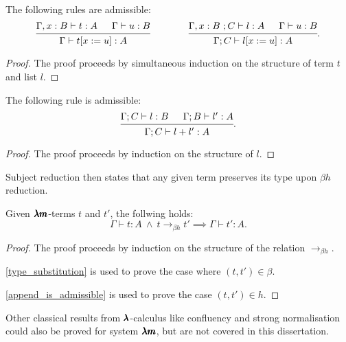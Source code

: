 \begin{lemma}
  \label{type_substitution}
  The following rules are admissible:
  \[
    \begin{prooftree}
      \hypo{ \Gamma , x:B \vdash t:A }
      \hypo{ \Gamma \vdash u:B }
      \infer2{ \Gamma \vdash  t[x := u] : A }      
    \end{prooftree}
    \qquad \qquad
    \begin{prooftree}
      \hypo{ \Gamma , x:B \ ; C \vdash l:A }
      \hypo{ \Gamma \vdash u:B }
      \infer2{ \Gamma ; C \vdash  l[x := u] : A }
    \end{prooftree}.
  \]
\end{lemma}
\begin{proof}
  The proof proceeds by simultaneous induction on the structure of term $t$ and list $l$.
\end{proof}

\begin{lemma}
  \label{append_is_admissible}
  The following rule is admissible:
  \[
    \begin{prooftree}
      \hypo{ \Gamma ; C \vdash l:B }
      \hypo{ \Gamma ; B \vdash l':A }
      \infer2{ \Gamma ; C \vdash  l+l' : A }
    \end{prooftree}.
  \]
\end{lemma}
\begin{proof}
  The proof proceeds by induction on the structure of $l$.
\end{proof}


Subject reduction then states that any given term preserves its type upon $\beta h$ reduction.

\begin{theorem}
  \label{type_preservation}
  Given $\pmb{\lambda m}$-terms $t$ and $t'$, the follwing holds:
  \[
    \Gamma \vdash t : A \ \land \ t \to_{\beta h} t' \implies \Gamma \vdash t' : A.
  \]
\end{theorem}
\begin{proof}
  The proof proceeds by induction on the structure of the relation $\to_{\beta h}$.

  \cref{type_substitution} is used to prove the case where $(t, t') \in \beta$.

  \cref{append_is_admissible} is used to prove the case $(t, t') \in h$.
\end{proof}

Other classical results from $\pmb{\lambda}$-calculus like confluency and strong normalisation could also be proved for system $\pmb{\lambda m}$, but are not covered in this dissertation.

